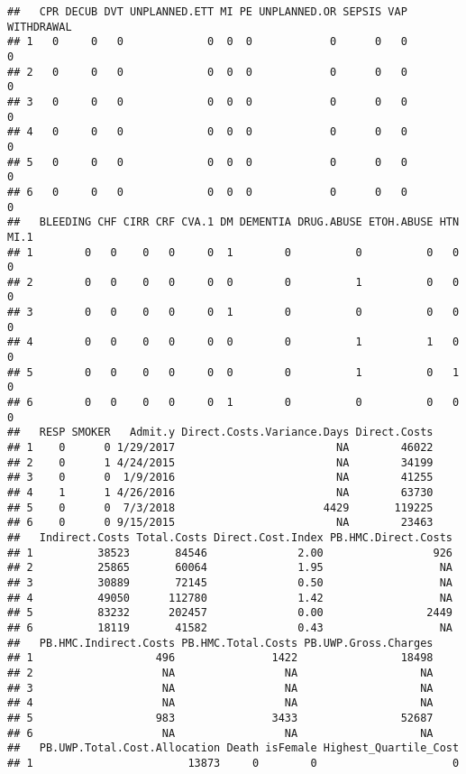 \documentclass[]{article}
\begin{document}
\begin{verbatim}
##   CPR DECUB DVT UNPLANNED.ETT MI PE UNPLANNED.OR SEPSIS VAP WITHDRAWAL
## 1   0     0   0             0  0  0            0      0   0          0
## 2   0     0   0             0  0  0            0      0   0          0
## 3   0     0   0             0  0  0            0      0   0          0
## 4   0     0   0             0  0  0            0      0   0          0
## 5   0     0   0             0  0  0            0      0   0          0
## 6   0     0   0             0  0  0            0      0   0          0
##   BLEEDING CHF CIRR CRF CVA.1 DM DEMENTIA DRUG.ABUSE ETOH.ABUSE HTN MI.1
## 1        0   0    0   0     0  1        0          0          0   0    0
## 2        0   0    0   0     0  0        0          1          0   0    0
## 3        0   0    0   0     0  1        0          0          0   0    0
## 4        0   0    0   0     0  0        0          1          1   0    0
## 5        0   0    0   0     0  0        0          1          0   1    0
## 6        0   0    0   0     0  1        0          0          0   0    0
##   RESP SMOKER   Admit.y Direct.Costs.Variance.Days Direct.Costs
## 1    0      0 1/29/2017                         NA        46022
## 2    0      1 4/24/2015                         NA        34199
## 3    0      0  1/9/2016                         NA        41255
## 4    1      1 4/26/2016                         NA        63730
## 5    0      0  7/3/2018                       4429       119225
## 6    0      0 9/15/2015                         NA        23463
##   Indirect.Costs Total.Costs Direct.Cost.Index PB.HMC.Direct.Costs
## 1          38523       84546              2.00                 926
## 2          25865       60064              1.95                  NA
## 3          30889       72145              0.50                  NA
## 4          49050      112780              1.42                  NA
## 5          83232      202457              0.00                2449
## 6          18119       41582              0.43                  NA
##   PB.HMC.Indirect.Costs PB.HMC.Total.Costs PB.UWP.Gross.Charges
## 1                   496               1422                18498
## 2                    NA                 NA                   NA
## 3                    NA                 NA                   NA
## 4                    NA                 NA                   NA
## 5                   983               3433                52687
## 6                    NA                 NA                   NA
##   PB.UWP.Total.Cost.Allocation Death isFemale Highest_Quartile_Cost
## 1                        13873     0        0                     0

\end{verbatim}
\end{document}
